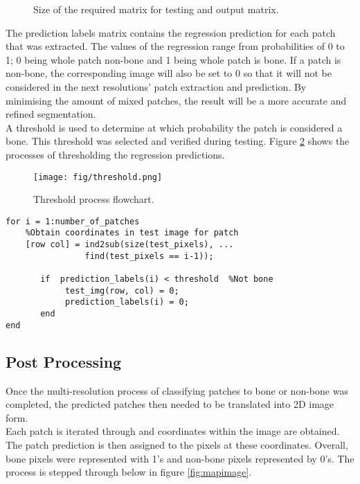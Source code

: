 \begin{figure}[H]
    \centering
    \qquad
    \caption{Size of the required matrix for testing and output matrix.}%
    \label{mat:testmat}
\end{figure}

The prediction labels matrix contains the regression prediction for each patch that was extracted. The values of the regression range from probabilities of 0 to 1; 0 being whole patch non-bone and 1 being whole patch is bone. If a patch is non-bone, the corresponding image will also be set to 0 so that it will not be considered in the next resolutions' patch extraction and prediction. By minimising the amount of mixed patches, the result will be a more accurate and refined segmentation. 
\\[1\baselineskip]
 A threshold is used to determine at which probability the patch is considered a bone. This threshold was selected and verified during testing. Figure \ref{fig:thresh} shows the processes of thresholding the regression predictions.

\begin{figure}[H]
\centering
\texttt{[image: fig/threshold.png]}
\caption{Threshold process flowchart.}
\label{fig:thresh}
\end{figure}

\begin{lstlisting}
for i = 1:number_of_patches 
	%Obtain coordinates in test image for patch
    [row col] = ind2sub(size(test_pixels), ...
    			find(test_pixels == i-1)); 
    
       if  prediction_labels(i) < threshold  %Not bone
            test_img(row, col) = 0; 
            prediction_labels(i) = 0;
       end 
end
\end{lstlisting}
\subsection{Post Processing}
Once the multi-resolution process of classifying patches to bone or non-bone was completed, the predicted patches then needed to be translated into 2D image form.
\\[1\baselineskip]
Each patch is iterated through and coordinates within the image are obtained. The patch prediction is then assigned to the pixels at these coordinates. Overall, bone pixels were represented with 1's and non-bone pixels represented by 0's. The process is stepped through below in figure \ref{fig:mapimage}.

